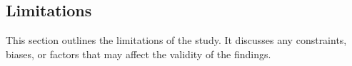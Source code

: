 \subsection{Limitations}

This section outlines the limitations of the study. It discusses any constraints, biases, or factors that may affect the validity of the findings.